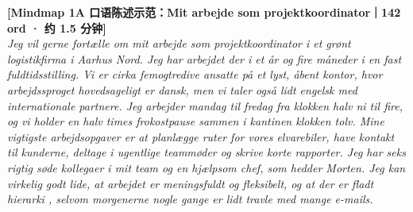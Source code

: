\begin{transbox}
\small
\textbf{\color{NCDNavy}[Mindmap 1A 口语陈述示范：Mit arbejde som projektkoordinator｜142 ord · 约 1.5 分钟]}\\
\textit{Jeg vil gerne fortælle om mit arbejde som projektkoordinator  i et grønt logistikfirma  i Aarhus Nord. Jeg har arbejdet der i et år og fire måneder i en fast fuldtidsstilling. Vi er cirka femogtredive ansatte  på et lyst, åbent kontor, hvor arbejdssproget hovedsageligt er dansk, men vi taler også lidt engelsk med internationale partnere. Jeg arbejder mandag til fredag fra klokken halv ni til fire, og vi holder en halv times frokostpause sammen i kantinen klokken tolv. Mine vigtigste arbejdsopgaver er at planlægge ruter for vores elvarebiler, have kontakt til kunderne, deltage i ugentlige teammøder og skrive korte rapporter. Jeg har seks rigtig søde kollegaer i mit team og en hjælpsom chef, som hedder Morten. Jeg kan virkelig godt lide, at arbejdet er meningsfuldt og fleksibelt, og at der er fladt hierarki , selvom morgenerne nogle gange er lidt travle med mange e-mails.}
\end{transbox}

